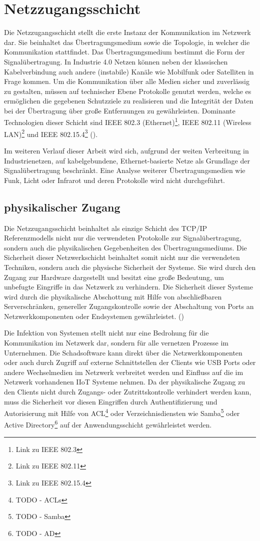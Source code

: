 \section{Netzzugangsschicht}
Die Netzzugangsschicht stellt die erste Instanz der Kommunikation im Netzwerk dar. Sie beinhaltet das Übertragungsmedium sowie die Topologie, in welcher die Kommunikation stattfindet. Das Übertragungsmedium bestimmt die Form der Signalübertragung. In Industrie 4.0 Netzen können neben der klassischen Kabelverbindung auch andere (instabile) Kanäle wie Mobilfunk oder Satelliten in Frage kommen. Um die Kommunikation über alle Medien sicher und zuverlässig zu gestalten, müssen auf technischer Ebene Protokolle genutzt werden, welche es ermöglichen die gegebenen Schutzziele zu realisieren und die Integrität der Daten bei der Übertragung über große Entfernungen zu gewährleisten. Dominante Technologien dieser Schicht sind \ac{IEEE} 802.3 (Ethernet)\footnote{Link zu IEEE 802.3}, \ac{IEEE} 802.11 (Wireless LAN)\footnote{Link zu IEEE 802.11} und \ac{IEEE} 802.15.4\footnote{Link zu IEEE 802.15.4} (\cite{sichKom2017}).

Im weiteren Verlauf dieser Arbeit wird sich, aufgrund der weiten Verbreitung in Industrienetzen, auf kabelgebundene, Ethernet-basierte Netze als Grundlage der Signalübertragung beschränkt. Eine Analyse weiterer Übertragungsmedien wie Funk, Licht oder Infrarot und deren Protokolle wird nicht durchgeführt.

\subsection{physikalischer Zugang}
Die Netzzugangsschicht beinhaltet als einzige Schicht des \ac{TCP}/\ac{IP} Referenzmodells nicht nur die verwendeten Protokolle zur Signalübertragung, sondern auch die physikalischen Gegebenheiten des Übertragungsmediums. Die Sicherheit dieser Netzwerkschicht beinhaltet somit nicht nur die verwendeten Techniken, sondern auch die physische Sicherheit der Systeme. Sie wird durch den Zugang zur Hardware dargestellt und besitzt eine große Bedeutung, um unbefugte Eingriffe in das Netzwerk zu verhindern. Die Sicherheit dieser Systeme wird durch die physikalische Abschottung mit Hilfe von abschließbaren Serverschränken, genereller Zugangskontrolle sowie der Abschaltung von Ports an Netzwerkkomponenten oder Endsystemen gewährleistet. (\cite{sichKom2017})

Die Infektion von Systemen stellt nicht nur eine Bedrohung für die Kommunikation im Netzwerk dar, sondern für alle vernetzen Prozesse im Unternehmen. Die Schadsoftware kann direkt über die Netzwerkkomponenten oder auch durch Zugriff auf externe Schnittstellen der Clients wie \ac{USB} Ports oder andere Wechselmedien im Netzwerk verbreitet werden und Einfluss auf die im Netzwerk vorhandenen \ac{IIoT} Systeme nehmen. Da der physikalische Zugang zu den Clients nicht durch Zugangs- oder Zutrittskontrolle verhindert werden kann, muss die Sicherheit vor diesen Eingriffen durch Authentifizierung und Autorisierung mit Hilfe von \ac{ACL}\footnote{TODO - ACLs} oder Verzeichnisdiensten wie Samba\footnote{TODO - Samba} oder Active Directory\footnote{TODO - AD} auf der Anwendungsschicht gewährleistet werden.


